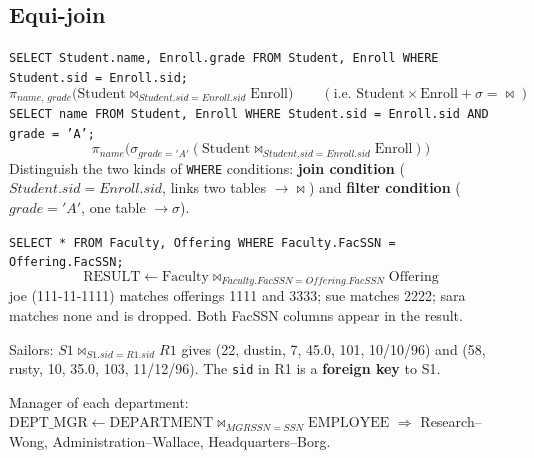 \documentclass[10pt,a4paper]{article}
\newcommand{\R}[1]{\mathrm{#1}}          %
\begin{document}
\subsection{Equi-join}
\begin{exbox}[Slides 228, 229, 231, 232, 251]
\texttt{SELECT Student.name, Enroll.grade FROM Student, Enroll WHERE Student.sid = Enroll.sid;}
\[ \pi_{name,\,grade}\big(\R{Student} \bowtie_{Student.sid=Enroll.sid} \R{Enroll}\big) \qquad (\text{i.e. } \R{Student} \times \R{Enroll} + \sigma = \bowtie) \]
\texttt{SELECT name FROM Student, Enroll WHERE Student.sid = Enroll.sid AND grade = 'A';}
\[ \pi_{name}\big(\sigma_{grade='A'}(\R{Student} \bowtie_{Student.sid=Enroll.sid} \R{Enroll})\big) \]
Distinguish the two kinds of \texttt{WHERE} conditions: \textbf{join condition} ($Student.sid = Enroll.sid$, links two tables $\to \bowtie$) and \textbf{filter condition} ($grade = 'A'$, one table $\to \sigma$).

\texttt{SELECT * FROM Faculty, Offering WHERE Faculty.FacSSN = Offering.FacSSN;}
\[ \R{RESULT} \leftarrow \R{Faculty} \bowtie_{Faculty.FacSSN=Offering.FacSSN} \R{Offering} \]
joe (111-11-1111) matches offerings 1111 and 3333; sue matches 2222; sara matches none and is dropped. Both FacSSN columns appear in the result.

Sailors: $S1 \bowtie_{S1.sid=R1.sid} R1$ gives (22, dustin, 7, 45.0, 101, 10/10/96) and (58, rusty, 10, 35.0, 103, 11/12/96). The \texttt{sid} in R1 is a \textbf{foreign key} to S1.

Manager of each department: $\R{DEPT\_MGR} \leftarrow \R{DEPARTMENT} \bowtie_{MGRSSN=SSN} \R{EMPLOYEE}$ $\Rightarrow$ Research--Wong, Administration--Wallace, Headquarters--Borg.
\end{exbox}
\end{document}
